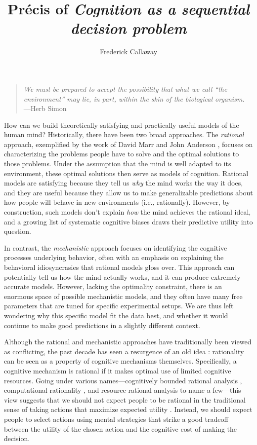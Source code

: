 \documentclass[11pt,a4paperpaper,]{article}
\title{Pr\'ecis of \emph{Cognition as a sequential decision problem}}
\author{Frederick Callaway}
\begin{document}
\maketitle

\begin{quote}
\emph{We must be prepared to accept the possibility that what we call
``the environment'' may lie, in part, within the skin of the biological
organism.} ---Herb Simon \citeyearpar{simon1955behavioral}
\end{quote}

How can we build theoretically satisfying and practically useful models of the human mind? Historically, there have been two broad approaches. The \emph{rational} approach, exemplified by the work of David Marr \citeyearpar{marr1982vision} and John Anderson \citeyearpar{anderson1990adaptive}, focuses on characterizing the problems people have to solve and the optimal solutions to those problems. Under the assumption that the mind is well adapted to its environment, these optimal solutions then serve as models of cognition. Rational models are satisfying because they tell us \emph{why} the mind works the way it does, and they are useful because they allow us to make generalizable predictions about how people will behave in new environments (i.e., rationally). However, by construction, such models don't explain \emph{how} the mind achieves the rational ideal, and a growing list of systematic cognitive biases \citep{kahneman2011thinking} draws their predictive utility into question.

In contrast, the \emph{mechanistic} approach focuses on identifying the cognitive processes underlying behavior, often with an emphasis on explaining the behavioral idiosyncrasies that rational models gloss over. This approach can potentially tell us how the mind actually works, and it can produce extremely accurate models. However, lacking the optimality constraint, there is an enormous space of possible mechanistic models, and they often have many free parameters that are tuned for specific experimental setups. We are thus left wondering why this specific model fit the data best, and whether it would continue to make good predictions in a slightly different context.

Although the rational and mechanistic approaches have traditionally been viewed as conflicting, the past decade has seen a resurgence of an old idea \citep{simon1955behavioral}: rationality can be seen as a property of cognitive mechanisms themselves. Specifically, a cognitive mechanism is rational if it makes optimal use of limited cognitive resources. Going under various names---cognitively bounded rational analysis \citep{howes2009rational}, computational rationality \citep{lewis2014computational,gershman2015computational}, and resource-rational analysis \citep{griffiths2015rational,lieder2020resourcerational} to name a few---this view suggests that we should not expect people to be rational in the traditional sense of taking actions that maximize expected utility \citep{vonneumann1944theory}. Instead, we should expect people to select actions using mental strategies that strike a good tradeoff between the utility of the chosen action and the cognitive cost of making the decision.
\end{document}
